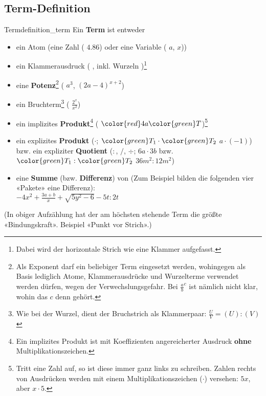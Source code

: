 \subsection{Term-Definition}
\begin{definition}{Term}{definition_term}
  Ein \textbf{Term} ist entweder
  \begin{itemize}
  \item ein Atom (eine Zahl (\zB{} $4.86$) oder  eine Variable (\zB{}
  $a$, $x$))
  \item ein Klammerausdruck (\zB{} , inkl.  Wurzeln )\footnote{Dabei wird der
  horizontale Strich wie eine Klammer aufgefasst.}
   \item eine \textbf{Potenz}\footnote{Als Exponent darf
     ein beliebiger Term eingesetzt werden, wohingegen als Basis
     lediglich Atome, Klammerausdrücke und Wurzelterme verwendet
     werden dürfen, wegen der Verwechslungsgefahr. Bei
     ${\frac{a}{b}}^c$ ist nämlich nicht klar, wohin das $c$ denn gehört.} ( \zB{} $a^3$, $(2a - 4)^{x+2}$)
    \item  ein Bruchterm\footnote{Wie bei der Wurzel, dient der Bruchstrich als Klammerpaar: $\frac{U}{V}=(U):(V)$} ( \zB{} $\frac{2^x}{x^2}$)
    \item ein implizites \textbf{Produkt}\footnote{Ein implizites
      Produkt ist mit Koeffizienten angereicherter Ausdruck
      \textbf{ohne} Multiplikationszeichen.} (\zB{}
      ${\color{red}4a}{\color{green}T}$)\footnote{Tritt eine Zahl auf,
      so ist diese immer ganz links zu schreiben. Zahlen rechts von
      Ausdrücken werden mit einem Multiplikationszeichen ($\cdot$) versehen: $5x$, aber $x\cdot{}5$.}
    \item ein explizites \textbf{Produkt} ($\cdot$;  ${\color{green}T_1}\cdot {\color{green}T_2}$ \zB{} $a\cdot(-1)$) bzw. ein expliziter \textbf{Quotient} ($:$, $/$, $\div$; $6a\cdot3b$ bzw. ${\color{green}T_1}:{\color{green}T_2}$ \zB{} $36m^2:12m^2$)
  \item eine \textbf{Summe} (bzw. \textbf{Differenz}) von 
  (Zum Beispiel bilden die folgenden
  vier «Pakete» eine Differenz):\\
  $-4x^2 + \frac{3a+b}{x} + \sqrt{5y^2-6} - 5t:2t$

    \end{itemize}
(In obiger Aufzählung hat der am höchsten stehende Term die größte
«Bindungskraft». Beispiel «Punkt vor Strich».)
\end{definition}

